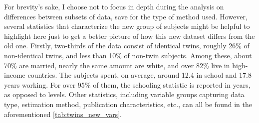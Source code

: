 For brevity's sake, I choose not to focus in depth during the analysis on differences between subsets of data, save for the type of method used. However, several statistics that characterize the new group of subjects might be helpful to highlight here just to get a better picture of how this new dataset differs from the old one. Firstly, two-thirds of the data consist of identical twins, roughly 26\% of non-identical twins, and less than 10\% of non-twin subjects. Among these, about 70\% are married, nearly the same amount are white, and over 82\% live in high-income countries. The subjects spent, on average, around 12.4 in school and 17.8 years working. For over 95\% of them, the schooling statistic is reported in years, as opposed to levels. Other statistics, including variable groups capturing data type, estimation method, publication characteristics, etc., can all be found in the aforementioned \autoref{tab:twins_new_vars}.

